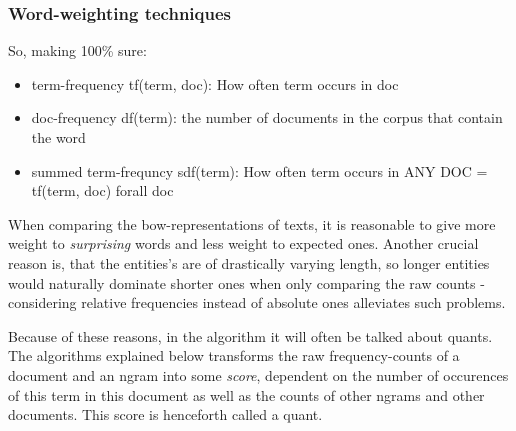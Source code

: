 \subsubsection*{Word-weighting techniques}
\label{sec:word_count_techniques}

So, making 100\% sure:

\begin{itemize}
    \item term-frequency tf(term, doc): How often term occurs in doc
    \item doc-frequency df(term):  the number of documents in the corpus that contain the word
    \item summed term-frequncy sdf(term): How often term occurs in ANY DOC = tf(term, doc) forall doc
\end{itemize}

When comparing the \gls{bow}-representations of texts, it is reasonable to give more weight to \emph{surprising} words and less weight to expected ones.  \cite[156]{Turney2010} 
Another crucial reason is, that the entities's are of drastically varying length, so longer entities would naturally dominate shorter ones when only comparing the raw counts - considering relative frequencies instead of absolute ones alleviates such problems.

Because of these reasons, in the algorithm it will often be talked about \glspl{quant}. The algorithms explained below transforms the raw frequency-counts of a document and an \gls{ngram} into some \emph{score}, dependent on the number of occurences of this term in this document as well as the counts of other \glspl{ngram} and other documents. This score is henceforth called a \gls{quant}.


\label{sec:embeddings}



